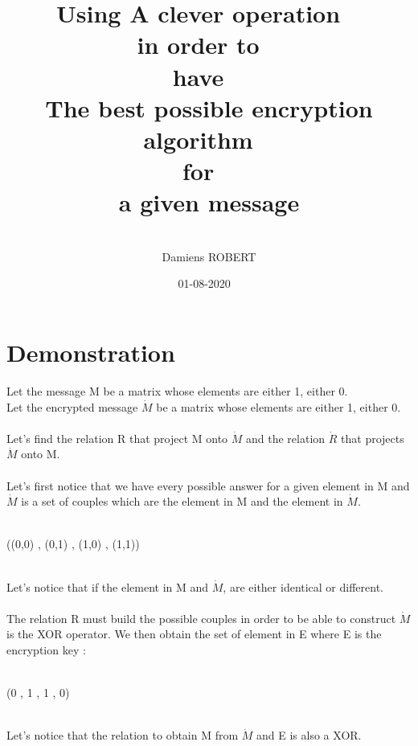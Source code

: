 \documentclass{article}
\title{Using A clever operation
~\\
in order to
~\\
have
~\\
The best possible encryption algorithm
~\\
for
~\\
a given message
}
\date{01-08-2020
~\\
}
\author{
~\\
Damiens ROBERT
}
\begin{document}
  \maketitle
  \section{Demonstration}
    Let the message M be a matrix whose elements are either 1, either 0.
    ~\\
    Let the encrypted message $\dot{M}$ be a matrix whose elements are either 1, either 0.
    ~\\
    ~\\
    Let's find the relation R that project M onto $\dot{M}$ and the relation $\dot{R}$ that projects $\dot{M}$ onto M.
    ~\\
    ~\\
    Let's first notice that we have every possible answer for a given element in M and $\dot{M}$ is a set of couples which are the element in M and the element in $\dot{M}$.
    ~\\
    ~\\
    \centerline{
    ((0,0) , (0,1) , (1,0) , (1,1))
    }
    ~\\
    Let's notice that if the element in M and $\dot{M}$, are either identical or different.
    ~\\
    ~\\
    The relation R must build the possible couples in order to be able to construct $\dot{M}$ is the XOR operator. We then obtain the set of element in E where E is the encryption key :
    ~\\
    ~\\
    \centerline{
    (0 , 1 , 1 , 0)
    }
    ~\\
    Let's notice that the relation to obtain M from $\dot{M}$ and E is also a XOR.
\end{document}
